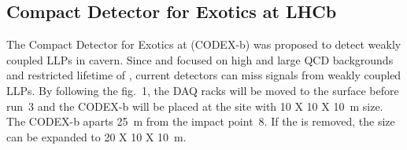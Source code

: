\subsection{Compact Detector for Exotics at LHCb}

The Compact Detector for Exotics at \lhcb (CODEX-b) was proposed to detect weakly coupled LLPs in \lhcb cavern. 
Since \atlas and \cms focused on high \pt and large QCD backgrounds and restricted lifetime of \lhcb, current detectors can miss signals from weakly coupled LLPs. 
By following the fig.~1, the DAQ racks will be moved to the surface before run~3 and the CODEX-b will be placed at the site with 10 X 10 X 10~m size. 
The CODEX-b aparts 25~m from the impact point~8. 
If the \delphi is removed, the size can be expanded to 20 X 10 X 10~m.


